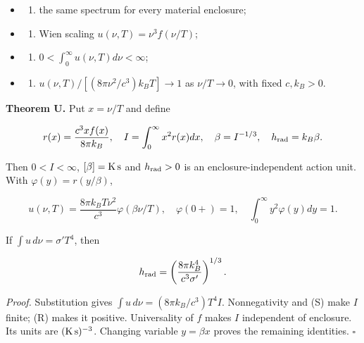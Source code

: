 \documentclass[11pt,a4paper]{article}
\newcommand{\tightlist}{\setlength{\itemsep}{0pt}\setlength{\parskip}{0pt}}
\begin{document}
\begin{itemize}
\item
  \begin{enumerate}
  \def\labelenumi{(\Alph{enumi})}
  \setcounter{enumi}{10}
  \tightlist
  \item
    the same spectrum for every material enclosure;
  \end{enumerate}
\item
  \begin{enumerate}
  \def\labelenumi{(\Alph{enumi})}
  \setcounter{enumi}{22}
  \tightlist
  \item
    Wien scaling \(u(\nu,T)=\nu^3 f(\nu/T)\);
  \end{enumerate}
\item
  \begin{enumerate}
  \def\labelenumi{(\Alph{enumi})}
  \setcounter{enumi}{18}
  \tightlist
  \item
    \(0<\int_0^\infty u(\nu,T)d\nu<\infty\);
  \end{enumerate}
\item
  \begin{enumerate}
  \def\labelenumi{(\Alph{enumi})}
  \setcounter{enumi}{17}
  \tightlist
  \item
    \(u(\nu,T)/[(8\pi\nu^2/c^3)k_BT]\to1\) as \(\nu/T\to0\), with fixed
    \(c,k_B>0\).
  \end{enumerate}
\end{itemize}

\textbf{Theorem U.} Put \(x=\nu/T\) and define

\[r(x)=\frac{c^3xf(x)}{8\pi k_B},\quad
I=\int_0^\infty x^2r(x)dx,\quad
\beta=I^{-1/3},\quad h_{\rm rad}=k_B\beta.\]

Then \(0<I<\infty\), \([\beta]={\rm K\,s}\) and \(h_{\rm rad}>0\) is an
enclosure-independent action unit. With \(\varphi(y)=r(y/\beta)\),

\[u(\nu,T)=\frac{8\pi k_BT\nu^2}{c^3}\varphi(\beta\nu/T),\quad
\varphi(0+)=1,\quad\int_0^\infty y^2\varphi(y)dy=1.\]

If \(\int u\,d\nu=\sigma'T^4\), then

\[h_{\rm rad}=\left(\frac{8\pi k_B^4}{c^3\sigma'}\right)^{1/3}.\]

\emph{Proof.} Substitution gives \(\int u\,d\nu=(8\pi k_B/c^3)T^4I\).
Nonnegativity and (S) make \(I\) finite; (R) makes it positive.
Universality of \(f\) makes \(I\) independent of enclosure. Its units
are \(({\rm K\,s})^{-3}\). Changing variable \(y=\beta x\) proves the
remaining identities. \(\square\)
\end{document}
